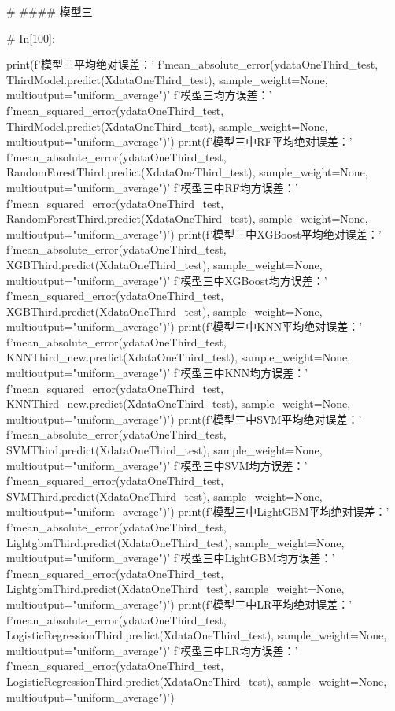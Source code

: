 \documentclass{MathorCupmodeling}
\begin{document}
\begin{python}
# #### 模型三

# In[100]:


print(f'模型三平均绝对误差：'
      f'{mean_absolute_error(ydataOneThird_test, ThirdModel.predict(XdataOneThird_test), sample_weight=None, multioutput="uniform_average")}\n'
      f'模型三均方误差：'
      f'{mean_squared_error(ydataOneThird_test, ThirdModel.predict(XdataOneThird_test), sample_weight=None, multioutput="uniform_average")}')
print(f'模型三中RF平均绝对误差：'
      f'{mean_absolute_error(ydataOneThird_test, RandomForestThird.predict(XdataOneThird_test), sample_weight=None, multioutput="uniform_average")}\n'
      f'模型三中RF均方误差：'
      f'{mean_squared_error(ydataOneThird_test, RandomForestThird.predict(XdataOneThird_test), sample_weight=None, multioutput="uniform_average")}')
print(f'模型三中XGBoost平均绝对误差：'
      f'{mean_absolute_error(ydataOneThird_test, XGBThird.predict(XdataOneThird_test), sample_weight=None, multioutput="uniform_average")}\n'
      f'模型三中XGBoost均方误差：'
      f'{mean_squared_error(ydataOneThird_test, XGBThird.predict(XdataOneThird_test), sample_weight=None, multioutput="uniform_average")}')
print(f'模型三中KNN平均绝对误差：'
      f'{mean_absolute_error(ydataOneThird_test, KNNThird_new.predict(XdataOneThird_test), sample_weight=None, multioutput="uniform_average")}\n'
      f'模型三中KNN均方误差：'
      f'{mean_squared_error(ydataOneThird_test, KNNThird_new.predict(XdataOneThird_test), sample_weight=None, multioutput="uniform_average")}')
print(f'模型三中SVM平均绝对误差：'
      f'{mean_absolute_error(ydataOneThird_test, SVMThird.predict(XdataOneThird_test), sample_weight=None, multioutput="uniform_average")}\n'
      f'模型三中SVM均方误差：'
      f'{mean_squared_error(ydataOneThird_test, SVMThird.predict(XdataOneThird_test), sample_weight=None, multioutput="uniform_average")}')
print(f'模型三中LightGBM平均绝对误差：'
      f'{mean_absolute_error(ydataOneThird_test, LightgbmThird.predict(XdataOneThird_test), sample_weight=None, multioutput="uniform_average")}\n'
      f'模型三中LightGBM均方误差：'
      f'{mean_squared_error(ydataOneThird_test, LightgbmThird.predict(XdataOneThird_test), sample_weight=None, multioutput="uniform_average")}')
print(f'模型三中LR平均绝对误差：'
      f'{mean_absolute_error(ydataOneThird_test, LogisticRegressionThird.predict(XdataOneThird_test), sample_weight=None, multioutput="uniform_average")}\n'
      f'模型三中LR均方误差：'
      f'{mean_squared_error(ydataOneThird_test, LogisticRegressionThird.predict(XdataOneThird_test), sample_weight=None, multioutput="uniform_average")}')



\end{python}
\end{document}
